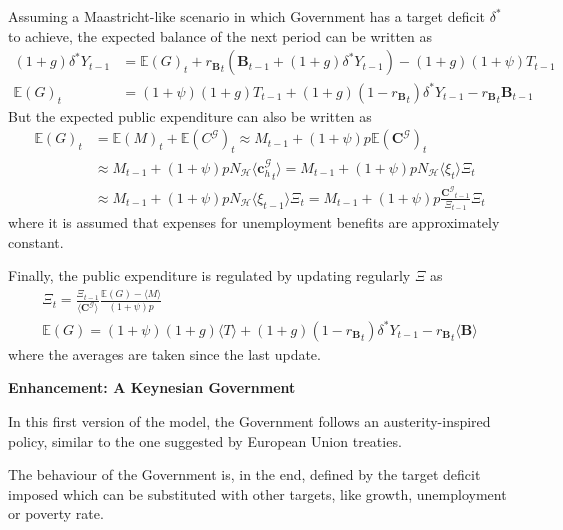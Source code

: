 \documentclass[a4paper, headings=standardclasses]{scrartcl}
\numberwithin{equation}{subsection}
\newenvironment{enh}[1][]{\begin{framed}\noindent\textbf{Enhancement: #1}\par}{\end{framed}}
\begin{document}
Assuming a Maastricht-like scenario in which Government has a target deficit $\delta^*$ to achieve, the expected balance of the next period can be written as
\begin{align*}
    (1+g) \delta^* Y_{t-1} & =  {\mathbb{E}(G)}_t + {r_\mathbf{B}}_t ({\mathbf{B}}_{t-1} + (1+g) \delta^* Y_{t-1}) - (1+g)(1+\psi) T_{t-1} \\
    \mathbb{E}(G)_t        & = (1+\psi)(1+g) T_{t-1} + (1+g)(1-{r_\mathbf{B}}_t)\delta^* Y_{t-1} - {r_\mathbf{B}}_t {\mathbf{B}}_{t-1}
\end{align*}
But the expected public expenditure can also be written as
\begin{align*}
    \mathbb{E}(G)_t & = \mathbb{E}(M)_t + \mathbb{E}(C^\mathcal{G})_t \approx M_{t-1} + (1+\psi)p\mathbb{E}(\mathbf{C}^\mathcal{G})_t                                          \\
                    & \approx M_{t-1} + (1+\psi) p N_\mathcal{H} \langle {\mathbf{c}^\mathcal{G}_h}_t \rangle = M_{t-1} + (1+\psi) p N_\mathcal{H} \langle \xi_t \rangle \Xi_t \\
                    & \approx M_{t-1} + (1+\psi) p N_\mathcal{H} \langle \xi_{t-1} \rangle \Xi_t = M_{t-1} + (1+\psi) p \frac{{\mathbf{C}^\mathcal{G}}_{t-1}}{\Xi_{t-1}} \Xi_t
\end{align*}
where it is assumed that expenses for unemployment benefits are approximately constant.

Finally, the public expenditure is regulated by updating regularly $\Xi$ as
\begin{gather*}
    \Xi_t          = \frac{\Xi_{t-1}}{\langle {\mathbf{C}^\mathcal{G}} \rangle} \frac{\mathbb{E}(G) - \langle M \rangle}{(1+\psi)p}                                                                                       \\
    \mathbb{E}(G)  = (1+\psi)(1+g) \langle T \rangle + (1+g)(1-{r_\mathbf{B}}_t)\delta^* Y_{t-1} - {r_\mathbf{B}}_t \langle{\mathbf{B}}\rangle
\end{gather*}
where the averages are taken since the last update.

\begin{enh}[A Keynesian Government]
    In this first version of the model, the Government follows an austerity-inspired policy, similar to the one suggested by European Union treaties.

    The behaviour of the Government is, in the end, defined by the target deficit imposed which can be substituted with other targets, like growth, unemployment or poverty rate.
\end{enh}
\end{document}
